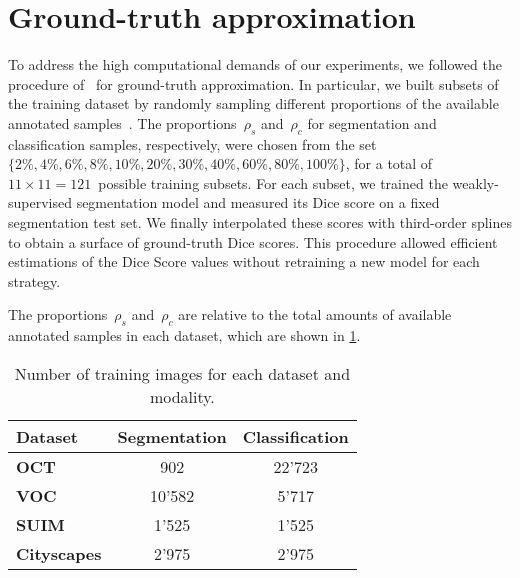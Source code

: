 \section{Ground-truth approximation}
\label{sec:gt}
To address the high computational demands of our experiments, we followed the procedure of~\cite{mahmood2022optimizing} for ground-truth approximation. 
In particular, we built subsets of the training dataset by randomly sampling different proportions of the available annotated samples~\cite{mahmood2022}. The proportions~$\rho_s$ and~$\rho_c$ for segmentation and classification samples, respectively, were chosen from the set~$\{2\%, 4\%,	6\%, 8\%, 10\%, 20\%, 30\%, 40\%, 60\%, 80\%, 100\%\}$, for a total of $11\times{}11=121$~possible training subsets. For each subset, we trained the weakly-supervised segmentation model and measured its Dice score on a fixed segmentation test set. We finally interpolated these scores with third-order splines to obtain a surface of ground-truth Dice scores. This procedure allowed efficient estimations of the Dice Score values without retraining a new model for each strategy.

The proportions~$\rho_s$ and~$\rho_c$ are relative to the total amounts of available annotated samples in each dataset, which are shown in \cref{tab:datasets}.



\begin{table}[h]
\centering
\begin{tabular}{lcc}
\hline
\textbf{Dataset} & \textbf{Segmentation} & \textbf{Classification} \\ \hline
\textbf{OCT} & 902 & 22'723 \\
\textbf{VOC} & 10'582 & 5'717 \\
\textbf{SUIM} & 1'525 & 1'525 \\
\textbf{Cityscapes} & 2'975 & 2'975 \\ \hline
\end{tabular}
\caption{Number of training images for each dataset and modality.}
\label{tab:datasets}
\end{table}
